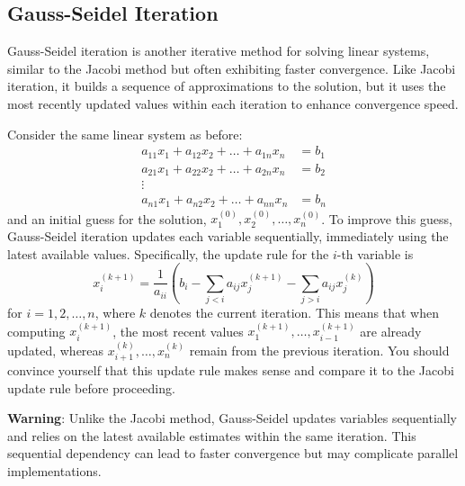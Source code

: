 \subsection{Gauss-Seidel Iteration}
Gauss-Seidel iteration is another iterative method for solving linear systems, similar to the Jacobi method but often exhibiting faster convergence. Like Jacobi iteration, it builds a sequence of approximations to the solution, but it uses the most recently updated values within each iteration to enhance convergence speed.

Consider the same linear system as before:
\begin{align*}
    a_{11}x_1 + a_{12}x_2 + \dots + a_{1n}x_n & = b_1 \\
    a_{21}x_1 + a_{22}x_2 + \dots + a_{2n}x_n & = b_2 \\
    \vdots & \\
    a_{n1}x_1 + a_{n2}x_2 + \dots + a_{nn}x_n & = b_n
\end{align*}
and an initial guess for the solution, $ x_1^{(0)}, x_2^{(0)}, \dots, x_n^{(0)} $. To improve this guess, Gauss-Seidel iteration updates each variable sequentially, immediately using the latest available values. Specifically, the update rule for the $i$-th variable is
\begin{equation*}
    x_i^{(k+1)} = \frac{1}{a_{ii}} \left( b_i - \sum_{j < i} a_{ij}x_j^{(k+1)} - \sum_{j > i} a_{ij}x_j^{(k)} \right)
\end{equation*}
for $ i = 1, 2, \dots, n $, where $ k $ denotes the current iteration. This means that when computing $ x_i^{(k+1)} $, the most recent values $ x_1^{(k+1)}, \dots, x_{i-1}^{(k+1)} $ are already updated, whereas $ x_{i+1}^{(k)}, \dots, x_n^{(k)} $ remain from the previous iteration. You should convince yourself that this update rule makes sense and compare it to the Jacobi update rule before proceeding.

\begin{warningBox}
    \textbf{Warning}: Unlike the Jacobi method, Gauss-Seidel updates variables sequentially and relies on the latest available estimates within the same iteration. This sequential dependency can lead to faster convergence but may complicate parallel implementations.
\end{warningBox}

